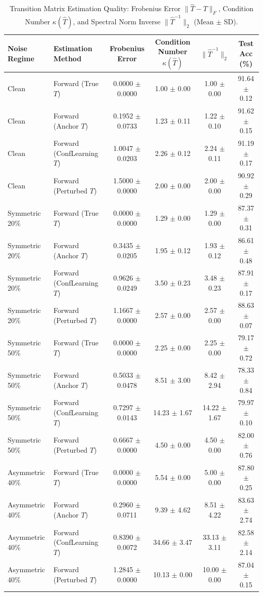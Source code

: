 \begin{table}[t]
\centering
\caption{Transition Matrix Estimation Quality: Frobenius Error $\|\hat{T} - T\|_F$, Condition Number $\kappa(\hat{T})$, and Spectral Norm Inverse $\|\hat{T}^{-1}\|_2$ (Mean $\pm$ SD).}
\label{tab:matrix_estimation}
\small
\begin{tabular}{llcccc}
\hline
\textbf{Noise Regime} & \textbf{Estimation Method} & \textbf{Frobenius Error} & \textbf{Condition Number $\kappa(\hat{T})$} & \textbf{$\|\hat{T}^{-1}\|_2$} & \textbf{Test Acc (\%)} \\
\hline
Clean & Forward (True $T$) & 0.0000 $\pm$ 0.0000 & 1.00 $\pm$ 0.00 & 1.00 $\pm$ 0.00 & 91.64 $\pm$ 0.12 \\
Clean & Forward (Anchor $T$) & 0.1952 $\pm$ 0.0733 & 1.23 $\pm$ 0.11 & 1.22 $\pm$ 0.10 & 91.62 $\pm$ 0.15 \\
Clean & Forward (ConfLearning $T$) & 1.0047 $\pm$ 0.0203 & 2.26 $\pm$ 0.12 & 2.24 $\pm$ 0.11 & 91.19 $\pm$ 0.17 \\
Clean & Forward (Perturbed $T$) & 1.5000 $\pm$ 0.0000 & 2.00 $\pm$ 0.00 & 2.00 $\pm$ 0.00 & 90.92 $\pm$ 0.29 \\
\hline
Symmetric 20\% & Forward (True $T$) & 0.0000 $\pm$ 0.0000 & 1.29 $\pm$ 0.00 & 1.29 $\pm$ 0.00 & 87.37 $\pm$ 0.31 \\
Symmetric 20\% & Forward (Anchor $T$) & 0.3435 $\pm$ 0.0205 & 1.95 $\pm$ 0.12 & 1.93 $\pm$ 0.12 & 86.61 $\pm$ 0.48 \\
Symmetric 20\% & Forward (ConfLearning $T$) & 0.9626 $\pm$ 0.0249 & 3.50 $\pm$ 0.23 & 3.48 $\pm$ 0.23 & 87.91 $\pm$ 0.17 \\
Symmetric 20\% & Forward (Perturbed $T$) & 1.1667 $\pm$ 0.0000 & 2.57 $\pm$ 0.00 & 2.57 $\pm$ 0.00 & 88.63 $\pm$ 0.07 \\
\hline
Symmetric 50\% & Forward (True $T$) & 0.0000 $\pm$ 0.0000 & 2.25 $\pm$ 0.00 & 2.25 $\pm$ 0.00 & 79.17 $\pm$ 0.72 \\
Symmetric 50\% & Forward (Anchor $T$) & 0.5033 $\pm$ 0.0478 & 8.51 $\pm$ 3.00 & 8.42 $\pm$ 2.94 & 78.33 $\pm$ 0.84 \\
Symmetric 50\% & Forward (ConfLearning $T$) & 0.7297 $\pm$ 0.0143 & 14.23 $\pm$ 1.67 & 14.22 $\pm$ 1.67 & 79.97 $\pm$ 0.10 \\
Symmetric 50\% & Forward (Perturbed $T$) & 0.6667 $\pm$ 0.0000 & 4.50 $\pm$ 0.00 & 4.50 $\pm$ 0.00 & 82.00 $\pm$ 0.76 \\
\hline
Asymmetric 40\% & Forward (True $T$) & 0.0000 $\pm$ 0.0000 & 5.54 $\pm$ 0.00 & 5.00 $\pm$ 0.00 & 87.80 $\pm$ 0.25 \\
Asymmetric 40\% & Forward (Anchor $T$) & 0.2960 $\pm$ 0.0711 & 9.39 $\pm$ 4.62 & 8.51 $\pm$ 4.22 & 83.63 $\pm$ 2.74 \\
Asymmetric 40\% & Forward (ConfLearning $T$) & 0.8390 $\pm$ 0.0072 & 34.66 $\pm$ 3.47 & 33.13 $\pm$ 3.11 & 82.58 $\pm$ 2.14 \\
Asymmetric 40\% & Forward (Perturbed $T$) & 1.2845 $\pm$ 0.0000 & 10.13 $\pm$ 0.00 & 10.00 $\pm$ 0.00 & 87.04 $\pm$ 0.15 \\
\hline
\end{tabular}
\end{table}
